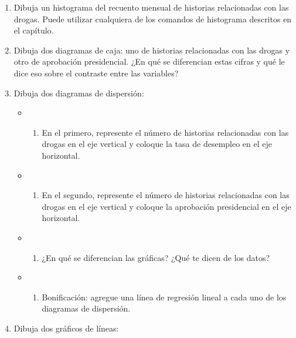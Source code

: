 \documentclass[
]{book}
\providecommand{\tightlist}{%
  \setlength{\itemsep}{0pt}\setlength{\parskip}{0pt}}
\begin{document}
\begin{enumerate}
\def\labelenumi{\arabic{enumi}.}
\item
  Dibuja un histograma del recuento mensual de historias relacionadas con las drogas. Puede utilizar cualquiera de los comandos de histograma descritos en el capítulo.
\item
  Dibuja dos diagramas de caja: uno de historias relacionadas con las drogas y otro de aprobación presidencial. ¿En qué se diferencian estas cifras y qué le dice eso sobre el contraste entre las variables?
\item
  Dibuja dos diagramas de dispersión:

  \begin{itemize}
  \item
    \begin{enumerate}
    \def\labelenumii{(\alph{enumii})}
    \tightlist
    \item
      En el primero, represente el número de historias relacionadas con las drogas en el eje vertical y coloque la tasa de desempleo en el eje horizontal.
    \end{enumerate}
  \item
    \begin{enumerate}
    \def\labelenumii{(\alph{enumii})}
    \setcounter{enumii}{1}
    \tightlist
    \item
      En el segundo, represente el número de historias relacionadas con las drogas en el eje vertical y coloque la aprobación presidencial en el eje horizontal.
    \end{enumerate}
  \item
    \begin{enumerate}
    \def\labelenumii{(\alph{enumii})}
    \setcounter{enumii}{2}
    \tightlist
    \item
      ¿En qué se diferencian las gráficas? ¿Qué te dicen de los datos?
    \end{enumerate}
  \item
    \begin{enumerate}
    \def\labelenumii{(\alph{enumii})}
    \setcounter{enumii}{3}
    \tightlist
    \item
      Bonificación: agregue una línea de regresión lineal a cada uno de los diagramas de dispersión.
    \end{enumerate}
  \end{itemize}
\item
  Dibuja dos gráficos de líneas:


\end{enumerate}
\end{document}
